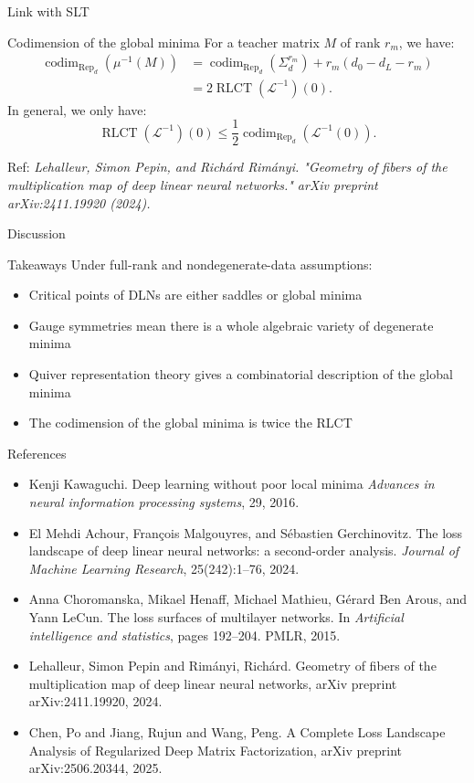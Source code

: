 \documentclass[aspectratio=169,11pt]{beamer}
\begin{document}
\begin{frame}{Link with SLT}
\begin{block}{Codimension of the global minima}
For a teacher matrix $M$ of rank $r_m$, we have:
    \[
    \begin{aligned}
    \operatorname{codim}_{\operatorname{Rep}_d}(\mu^{-1}(M))
    &=
    \operatorname{codim}_{\operatorname{Rep}_d}(\Sigma_d^{r_m})
    + r_m(d_0 - d_L - r_m) \\
    &= 2\operatorname{RLCT}(\mathcal{L}^{-1})(0).
    \end{aligned}
    \]
In general, we only have:
\[
\operatorname{RLCT}(\mathcal{L}^{-1})(0)  \leq \frac{1}{2}\operatorname{codim}_{\operatorname{Rep}_d}(\mathcal{L}^{-1}(0)).
\]
\end{block}
Ref: \textit{Lehalleur, Simon Pepin, and Richárd Rimányi. "Geometry of fibers of the multiplication map of deep linear neural networks." arXiv preprint arXiv:2411.19920 (2024).}
\end{frame}
\begin{frame}{Discussion}
\begin{block}{Takeaways}
Under full-rank and nondegenerate-data assumptions:
    \begin{itemize}
        \item Critical points of DLNs are either saddles or global minima
        \item Gauge symmetries mean there is a whole algebraic variety of degenerate minima
        \item Quiver representation theory gives a combinatorial description of the global minima
        \item The codimension of the global minima is twice the RLCT
    \end{itemize}
\end{block}
\end{frame}
\begin{frame}{References}
\begin{itemize}
    \item Kenji Kawaguchi. Deep learning without poor local minima \textit{Advances in neural
information processing systems}, 29, 2016.
    \item El Mehdi Achour, François Malgouyres, and Sébastien Gerchinovitz. The loss
landscape of deep linear neural networks: a second-order analysis. \textit{Journal of
Machine Learning Research}, 25(242):1–76, 2024.
    \item Anna Choromanska, Mikael Henaff, Michael Mathieu, Gérard Ben Arous, and
Yann LeCun. The loss surfaces of multilayer networks. In \textit{Artificial intelligence
and statistics}, pages 192–204. PMLR, 2015.
    \item Lehalleur, Simon Pepin and Rim{\'a}nyi, Rich{\'a}rd. Geometry of fibers of the multiplication map of deep linear neural networks, arXiv preprint arXiv:2411.19920, 2024.
    \item Chen, Po and Jiang, Rujun and Wang, Peng. A Complete Loss Landscape Analysis of Regularized Deep Matrix Factorization, arXiv preprint arXiv:2506.20344, 2025.
\end{itemize}
\end{frame}
\end{document}
